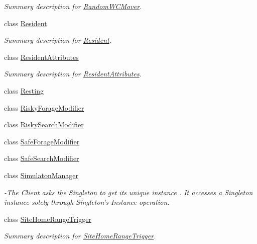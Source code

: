 \begin{DoxyCompactItemize}
\begin{DoxyCompactList}\small\item\em Summary description for \hyperlink{class_s_e_a_r_c_h_1_1_random_w_c_mover}{Random\-W\-C\-Mover}. \end{DoxyCompactList}\item 
class \hyperlink{class_s_e_a_r_c_h_1_1_resident}{Resident}
\begin{DoxyCompactList}\small\item\em Summary description for \hyperlink{class_s_e_a_r_c_h_1_1_resident}{Resident}. \end{DoxyCompactList}\item 
class \hyperlink{class_s_e_a_r_c_h_1_1_resident_attributes}{Resident\-Attributes}
\begin{DoxyCompactList}\small\item\em Summary description for \hyperlink{class_s_e_a_r_c_h_1_1_resident_attributes}{Resident\-Attributes}. \end{DoxyCompactList}\item 
class \hyperlink{class_s_e_a_r_c_h_1_1_resting}{Resting}
\item 
class \hyperlink{class_s_e_a_r_c_h_1_1_risky_forage_modifier}{Risky\-Forage\-Modifier}
\item 
class \hyperlink{class_s_e_a_r_c_h_1_1_risky_search_modifier}{Risky\-Search\-Modifier}
\item 
class \hyperlink{class_s_e_a_r_c_h_1_1_safe_forage_modifier}{Safe\-Forage\-Modifier}
\item 
class \hyperlink{class_s_e_a_r_c_h_1_1_safe_search_modifier}{Safe\-Search\-Modifier}
\item 
class \hyperlink{class_s_e_a_r_c_h_1_1_simulaton_manager}{Simulaton\-Manager}
\begin{DoxyCompactList}\small\item\em -\/\-The Client asks the Singleton to get its unique instance . It accesses a Singleton instance solely through Singleton's Instance operation. \end{DoxyCompactList}\item 
class \hyperlink{class_s_e_a_r_c_h_1_1_site_home_range_trigger}{Site\-Home\-Range\-Trigger}
\begin{DoxyCompactList}\small\item\em Summary description for \hyperlink{class_s_e_a_r_c_h_1_1_site_home_range_trigger}{Site\-Home\-Range\-Trigger}. \end{DoxyCompactList}\item 

\end{DoxyCompactItemize}
